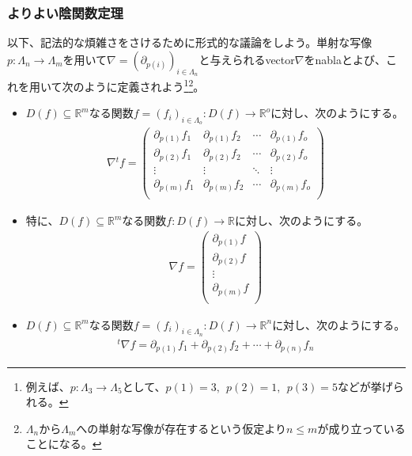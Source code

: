 \documentclass[dvipdfmx]{jsarticle}
\begin{document}
\subsubsection{よりよい陰関数定理}%
以下、記法的な煩雑さをさけるために形式的な議論をしよう。単射な写像$p:\varLambda_{n} \rightarrow \varLambda_{m}$を用いて$\nabla = \left( \partial_{p(i)} \right)_{i \in \varLambda_{n} }$と与えられるvector$\nabla$をnablaとよび、これを用いて次のように定義されよう\footnote{例えば、$p:\varLambda_{3} \rightarrow \varLambda_{5}$として、$p(1) = 3,\ \ p(2) = 1,\ \ p(3) = 5$などが挙げられる。}\footnote{$\varLambda_{n}$から$\varLambda_{m}$への単射な写像が存在するという仮定より$n \leq m$が成り立っていることになる。}。
\begin{itemize}
\item
  $D(f) \subseteq \mathbb{R}^{m}$なる関数$f = \left( f_{i} \right)_{i \in \varLambda_{o}}:D(f) \rightarrow \mathbb{R}^{o}$に対し、次のようにする。
\begin{align*}
\nabla{}^{t}f = \begin{pmatrix}
\partial_{p(1)}f_{1} & \partial_{p(1)}f_{2} & \cdots & \partial_{p(1)}f_{o} \\
\partial_{p(2)}f_{1} & \partial_{p(2)}f_{2} & \cdots & \partial_{p(2)}f_{o} \\
 \vdots & \vdots & \ddots & \vdots \\
\partial_{p(m)}f_{1} & \partial_{p(m)}f_{2} & \cdots & \partial_{p(m)}f_{o} \\
\end{pmatrix}
\end{align*}
\item
  特に、$D(f) \subseteq \mathbb{R}^{m}$なる関数$f:D(f) \rightarrow \mathbb{R}$に対し、次のようにする。
\begin{align*}
\nabla f = \begin{pmatrix}
\partial_{p(1)}f \\
\partial_{p(2)}f \\
 \vdots \\
\partial_{p(m)}f \\
\end{pmatrix}
\end{align*}
\item
  $D(f) \subseteq \mathbb{R}^{m}$なる関数$f = \left( f_{i} \right)_{i \in \varLambda_{n}}:D(f) \rightarrow \mathbb{R}^{n}$に対し、次のようにする。
\begin{align*}
{}^{t}\nabla f = \partial_{p(1)}f_{1} + \partial_{p(2)}f_{2} + \cdots + \partial_{p(n)}f_{n}
\end{align*}
\end{itemize}\par
\end{document}
